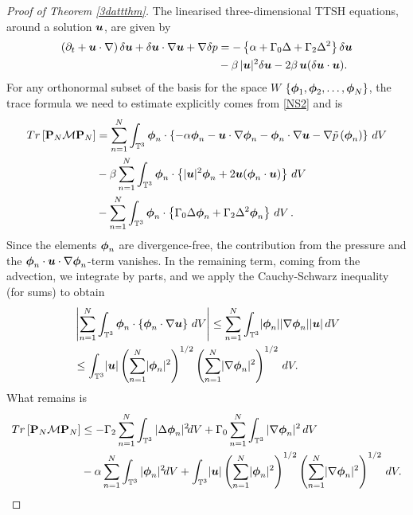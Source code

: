 \documentclass[11pt]{amsart}
\newcommand{\bphi}{\mbox{\boldmath$\phi$}}
\newcommand{\bu}{\mbox{\boldmath$u$}}
\newcommand{\Rb}{\beta}
\newcommand{\Gamzero}{\Gamma_{0}}
\newcommand{\Gamtwo}{\Gamma_{2}}
\newcommand{\beq}{\begin{eqnarray}\label}
\newcommand{\eeq}{\end{eqnarray}}
\theoremstyle{definition}
\numberwithin{equation}{section}
\numberwithin{equation}{section}
\begin{document}
\begin{proof}[Proof of Theorem \ref{3dattthm}] The linearised three-dimensional TTSH equations, around a solution $\bu$, are given by
\beq{NS2}
\left(\partial_{t} + \bu\cdot\nabla\right)\delta\bu + \delta\bu\cdot\nabla\bu + \nabla \delta p 
&= -\left\{\alpha + \Gamzero \Delta + \Gamtwo \Delta^{2}\right\}\delta\bu\nonumber\\
&- \Rb\,\lvert \bu \rvert^{2}\delta\bu - 2\Rb\,\bu(\delta \bu \cdot \bu ).
\eeq
For any orthonormal subset of the basis for the space $W$ $\left\{\bphi_{1}, \bphi_{2},\ldots,\bphi_{N}\right\}$, the trace formula we need to estimate explicitly comes from \eqref{NS2} and is 
\begin{align*}
Tr \left[\mathbf{P}_{N}\mathcal{M}\mathbf{P}_{N}\right]  &= \sum_{n=1}^{N}
\int_{\mathbb{T}^3} \bphi_{n}\cdot\left\{-\alpha\bphi_{n} - \bu\cdot\nabla\bphi_{n}-\bphi_{n}\cdot\nabla\bu 
- \nabla\tilde{p}\left(\bphi_{n}\right)\right\}\,dV\\
&-\Rb\sum_{n=1}^{N}\int_{\mathbb{T}^3} \bphi_{n}\cdot\left\{\lvert \bu \rvert^{2}\bphi_{n} + 2 \bu (\bphi_{n} \cdot \bu) \right\}\,dV\,\\
&-\sum_{n=1}^{N}\int_{\mathbb{T}^3} \bphi_{n}\cdot\left\{\Gamzero \Delta\bphi_{n} + \Gamtwo \Delta^{2}\bphi_{n}\right\}\,dV\,.
\end{align*}
Since the elements $\bphi_{n}$ are divergence-free, the contribution from the pressure and the $\bphi_{n}\cdot\bu\cdot\nabla\bphi_{n}$-term vanishes. In the remaining term, coming from the advection, we integrate by parts, and we apply the Cauchy-Schwarz inequality (for sums) to obtain
\begin{align*}
&\left\lvert \sum_{n=1}^{N}
\int_{\mathbb{T}^3} \bphi_{n}\cdot\left\{\bphi_{n}\cdot\nabla\bu 
\right\}\,dV \right\rvert \leq \sum_{n=1}^{N}
\int_{\mathbb{T}^3} \lvert \bphi_{n} \rvert \lvert \nabla \bphi_{n} \rvert \lvert \bu \rvert \,dV \\
&\leq \int_{\mathbb{T}^3} \lvert \bu \rvert \left( \sum_{n=1}^N \lvert \bphi_n \rvert^2 \right)^{1/2} \left( \sum_{n=1}^N \lvert \nabla \bphi_n \rvert^2 \right)^{1/2}  \,dV.
\end{align*} 
What remains is
\begin{align*}
Tr \left[ \mathbf{P}_{N}\mathcal{M}\mathbf{P}_{N}\right] &\leq - \Gamtwo \sum_{n=1}^{N} \int_{\mathbb{T}^3} |\Delta\bphi_{n}|^{2}\!
dV + \Gamzero \sum_{n=1}^{N} \int_{\mathbb{T}^3} |\nabla\bphi_{n}|^{2}\,dV \\
& -\alpha \sum_{n=1}^{N} \int_{\mathbb{T}^3}|\bphi_{n}|^{2} \!dV + \int_{\mathbb{T}^3} \lvert \bu \rvert \left( \sum_{n=1}^N \lvert \bphi_n \rvert^2 \right)^{1/2} \left( \sum_{n=1}^N \lvert \nabla \bphi_n \rvert^2 \right)^{1/2}  \,dV.

\end{align*}
\end{proof}
\end{document}
